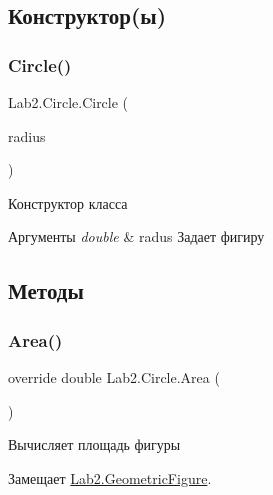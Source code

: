 \subsection{Конструктор(ы)}
\mbox{\label{class_lab2_1_1_circle_ac95d3e44e178cf6199237fc74698465c}} 
\subsubsection{\texorpdfstring{Circle()}{Circle()}}
{\footnotesize\ttfamily Lab2.\+Circle.\+Circle (\begin{DoxyParamCaption}\item[{double}]{radius }\end{DoxyParamCaption})}

Конструктор класса 
\begin{DoxyParams}{Аргументы}
{\em double} & radus Задает фигиру \\
\hline
\end{DoxyParams}


\subsection{Методы}
\mbox{\label{class_lab2_1_1_circle_afe38ef7cc9ce4b02a6e640d3029e5962}} 
\subsubsection{\texorpdfstring{Area()}{Area()}}
{\footnotesize\ttfamily override double Lab2.\+Circle.\+Area (\begin{DoxyParamCaption}{ }\end{DoxyParamCaption})\hspace{0.3cm}{\ttfamily [virtual]}}

Вычисляет площадь фигуры 

Замещает \hyperlink{class_lab2_1_1_geometric_figure}{Lab2.\+Geometric\+Figure}.

\mbox{\label{class_lab2_1_1_circle_a300cdfbc89e35dadfdcd35ff085ffc13}} 
